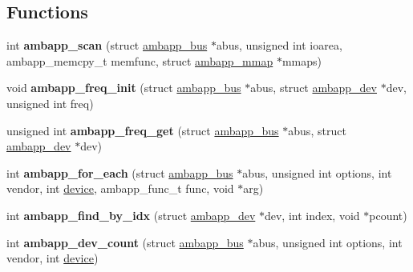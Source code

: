 \subsection*{Functions}
\begin{DoxyCompactItemize}
\item 
\mbox{\label{group__amba_gac37a6bb4558c0fd9ba44cd079bd89247}} 
int {\bfseries ambapp\+\_\+scan} (struct \mbox{\hyperlink{structambapp__bus}{ambapp\+\_\+bus}} $\ast$abus, unsigned int ioarea, ambapp\+\_\+memcpy\+\_\+t memfunc, struct \mbox{\hyperlink{structambapp__mmap}{ambapp\+\_\+mmap}} $\ast$mmaps)
\item 
\mbox{\label{group__amba_gadc9e798b4054caaf5f4693f2f189b6f5}} 
void {\bfseries ambapp\+\_\+freq\+\_\+init} (struct \mbox{\hyperlink{structambapp__bus}{ambapp\+\_\+bus}} $\ast$abus, struct \mbox{\hyperlink{structambapp__dev}{ambapp\+\_\+dev}} $\ast$dev, unsigned int freq)
\item 
\mbox{\label{group__amba_ga116a1d83dff03aa86a5cf86916577611}} 
unsigned int {\bfseries ambapp\+\_\+freq\+\_\+get} (struct \mbox{\hyperlink{structambapp__bus}{ambapp\+\_\+bus}} $\ast$abus, struct \mbox{\hyperlink{structambapp__dev}{ambapp\+\_\+dev}} $\ast$dev)
\item 
\mbox{\label{group__amba_gacff3e6ae3d3ee3ac957403734d9b6cfc}} 
int {\bfseries ambapp\+\_\+for\+\_\+each} (struct \mbox{\hyperlink{structambapp__bus}{ambapp\+\_\+bus}} $\ast$abus, unsigned int options, int vendor, int \mbox{\hyperlink{structdevice}{device}}, ambapp\+\_\+func\+\_\+t func, void $\ast$arg)
\item 
\mbox{\label{group__amba_ga4ae447f149a028ef3285307a820432c1}} 
int {\bfseries ambapp\+\_\+find\+\_\+by\+\_\+idx} (struct \mbox{\hyperlink{structambapp__dev}{ambapp\+\_\+dev}} $\ast$dev, int index, void $\ast$pcount)
\item 
\mbox{\label{group__amba_ga32e8361a08549924f458f2a4efb46de4}} 
int {\bfseries ambapp\+\_\+dev\+\_\+count} (struct \mbox{\hyperlink{structambapp__bus}{ambapp\+\_\+bus}} $\ast$abus, unsigned int options, int vendor, int \mbox{\hyperlink{structdevice}{device}})
\item 
\mbox{\label{group__amba_ga6ff73a90ec14aa3398c4c3be563d5ea0}} 

\end{DoxyCompactItemize}

